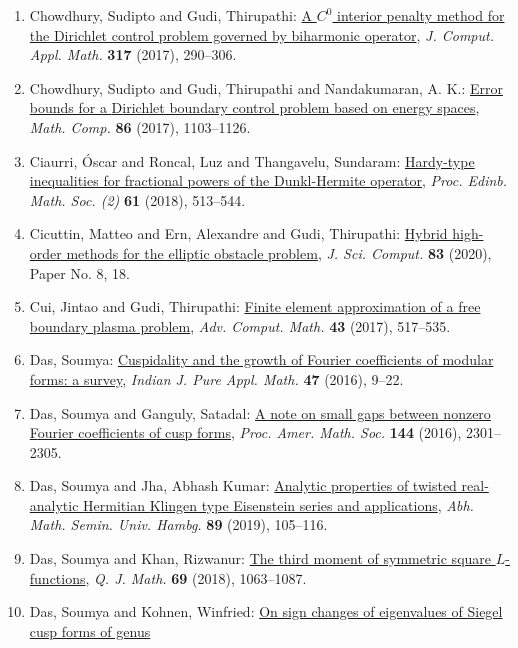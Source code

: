 \begin{enumerate}
\item Chowdhury, Sudipto and Gudi, Thirupathi: \href{https://doi.org/10.1016/j.cam.2016.12.005}{A {$C^0$} interior penalty method for the {D}irichlet control
problem governed by biharmonic operator}, \emph{J. Comput. Appl. Math.} {\bf 317} (2017), 290--306.
\item Chowdhury, Sudipto and Gudi, Thirupathi and Nandakumaran, A.
K.: \href{https://doi.org/10.1090/mcom/3125}{Error bounds for a {D}irichlet boundary control problem based
on energy spaces}, \emph{Math. Comp.} {\bf 86} (2017), 1103--1126.
\item Ciaurri, \'{O}scar and Roncal, Luz and Thangavelu, Sundaram: \href{https://doi.org/10.1017/s0013091517000311}{Hardy-type inequalities for fractional powers of the
{D}unkl-{H}ermite operator}, \emph{Proc. Edinb. Math. Soc. (2)} {\bf 61} (2018), 513--544.
\item Cicuttin, Matteo and Ern, Alexandre and Gudi, Thirupathi: \href{https://doi.org/10.1007/s10915-020-01195-z}{Hybrid high-order methods for the elliptic obstacle problem}, \emph{J. Sci. Comput.} {\bf 83} (2020), Paper No. 8, 18.
\item Cui, Jintao and Gudi, Thirupathi: \href{https://doi.org/10.1007/s10444-016-9495-7}{Finite element approximation of a free boundary plasma
problem}, \emph{Adv. Comput. Math.} {\bf 43} (2017), 517--535.
\item Das, Soumya: \href{https://doi.org/10.1007/s13226-015-0165-0}{Cuspidality and the growth of {F}ourier coefficients of
modular forms: a survey}, \emph{Indian J. Pure Appl. Math.} {\bf 47} (2016), 9--22.
\item Das, Soumya and Ganguly, Satadal: \href{https://doi.org/10.1090/proc/12887}{A note on small gaps between nonzero {F}ourier coefficients of
cusp forms}, \emph{Proc. Amer. Math. Soc.} {\bf 144} (2016), 2301--2305.
\item Das, Soumya and Jha, Abhash Kumar: \href{https://doi.org/10.1007/s12188-019-00206-7}{Analytic properties of twisted real-analytic {H}ermitian
{K}lingen type {E}isenstein series and applications}, \emph{Abh. Math. Semin. Univ. Hambg.} {\bf 89} (2019), 105--116.
\item Das, Soumya and Khan, Rizwanur: \href{https://doi.org/10.1093/qmath/hay012}{The third moment of symmetric square {$L$}-functions}, \emph{Q. J. Math.} {\bf 69} (2018), 1063--1087.
\item Das, Soumya and Kohnen, Winfried: \href{https://doi.org/10.4064/aa170419-4-11}{On sign changes of eigenvalues of {S}iegel cusp forms of genus
}
\end{enumerate}
